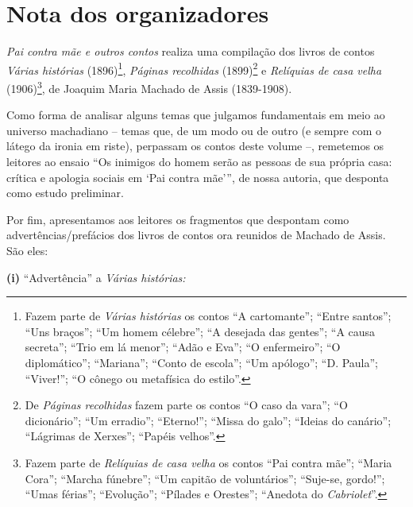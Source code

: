 
\chapter{Nota dos organizadores}

\emph{Pai contra mãe e outros contos} realiza uma compilação dos livros
de contos \emph{Várias histórias} (1896)\footnote{Fazem parte de
  \emph{Várias histórias} os contos ``A cartomante''; ``Entre santos'';
  ``Uns braços''; ``Um homem célebre''; ``A desejada das gentes''; ``A
  causa secreta''; ``Trio em lá menor''; ``Adão e Eva''; ``O
  enfermeiro''; ``O diplomático''; ``Mariana''; ``Conto de escola'';
  ``Um apólogo''; ``D. Paula''; ``Viver!''; ``O cônego ou metafísica do
  estilo''.}, \emph{Páginas recolhidas} (1899)\footnote{De \emph{Páginas
  recolhidas} fazem parte os contos ``O caso da vara''; ``O
  dicionário''; ``Um erradio''; ``Eterno!''; ``Missa do galo''; ``Ideias
  do canário''; ``Lágrimas de Xerxes''; ``Papéis velhos''.} e
\emph{Relíquias de casa velha} (1906)\footnote{Fazem parte de
  \emph{Relíquias de casa velha} os contos ``Pai contra mãe''; ``Maria
  Cora''; ``Marcha fúnebre''; ``Um capitão de voluntários''; ``Suje-se,
  gordo!''; ``Umas férias''; ``Evolução''; ``Pílades e Orestes'';
  ``Anedota do \emph{Cabriolet}''.}, de Joaquim Maria Machado de Assis
(1839-1908).

Como forma de analisar alguns temas que julgamos fundamentais em meio ao
universo machadiano -- temas que, de um modo ou de outro (e sempre com o
látego da ironia em riste), perpassam os contos deste volume --,
remetemos os leitores ao ensaio ``Os inimigos do homem serão as pessoas
de sua própria casa: crítica e apologia sociais em `Pai contra mãe''',
de nossa autoria, que desponta como estudo preliminar.

Por fim, apresentamos aos leitores os fragmentos que despontam como
advertências/prefácios dos livros de contos ora reunidos de Machado de
Assis. São eles:

\textbf{(i)} ``Advertência'' a \emph{Várias histórias: }

